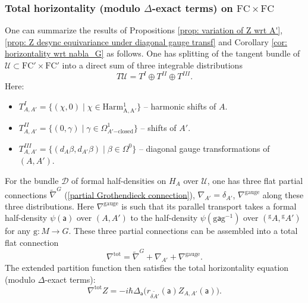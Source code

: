 \documentclass[11pt,a4paper]{amsart}
\theoremstyle{plain} %
\theoremstyle{definition}
\theoremstyle{remark}
\newtheorem{rem}[thm]{Remark}
\newcommand{\mr}{\mathrm}
\newcommand{\sfa}{\mathsf{a}}
\newcommand{\ra}{\rightarrow}
\newcommand{\til}{\widetilde}
\newcommand{\mc}{\mathcal}
\newcommand{\FC}{\mathrm{FC}}
\newcommand{\sfg}{\mathrm{g}} %
\begin{document}
{\subsubsection{Total horizontality (modulo $\Delta$-exact terms) on $\FC\times \FC$}
\label{sss: T^I+T^II+T^III}
    One can summarize the results of Propositions \ref{prop: variation of Z wrt A'}, \ref{prop: Z desync equivariance under diagonal gauge transf}  and Corollary 
    \ref{cor: horizontality wrt nabla_G}
    as follows. One has splitting of the tangent bundle of $\mc{U}\subset \FC'\times \FC'$ into a direct sum of three integrable distributions
    \begin{equation}\label{T^I+T^II+T^III}
        T\mc{U}=T^I\oplus T^{II} \oplus T^{III}.
    \end{equation}
Here:
\begin{itemize}
    \item $T^I_{A,A'}=\{(\chi,0)\;|\; \chi\in \mr{Harm^1_{A,A'}}\}$ -- harmonic shifts of $A$.
    \item $T^{II}_{A,A'}=\{(0,\gamma)\;|\; \gamma\in \Omega^1_{A'\mr{-closed}}\}$ -- shifts of $A'$.
    \item $T^{III}_{A,A'}=\{(d_A\beta,d_{A'}\beta)\;|\; \beta\in \Omega^0\}$ -- diagonal gauge transformations of $(A,A')$.
\end{itemize}
For the bundle $\mc{D}$ of formal half-densities on $H_A$ over $\mc{U}$, one has three flat partial connections
$\til\nabla^G$ (\ref{partial Grothendieck connection}), $\nabla_{A'}=\delta_{A'}$, $\nabla^\mr{gauge}$ along these three distributions. Here $\nabla^\mr{gauge}$ is such that its parallel transport takes a formal half-density $\psi(\sfa)$ over $(A,A')$ to the half-density $\psi(\sfg\sfa \sfg^{-1})$ over $({}^\sfg A,{}^\sfg A')$ for any $\sfg\colon M\ra G$.
These three partial connections can be assembled into a total flat connection
\begin{equation} \label{nabla^tot}
\nabla^\mr{tot}= \til\nabla^G+\nabla_{A'}+\nabla^\mr{gauge}.
\end{equation}
The extended partition function then satisfies the total horizontality equation (modulo $\Delta$-exact terms):
\begin{equation}\label{nabla^tot Zhat = 0}
    \nabla^\mr{tot} Z=
    -i\hbar\Delta_\sfa\Big( r_{{\til{\delta A'}}}(\sfa) Z_{A,A'}(\sfa)\Big).
\end{equation}
}
\end{document}
